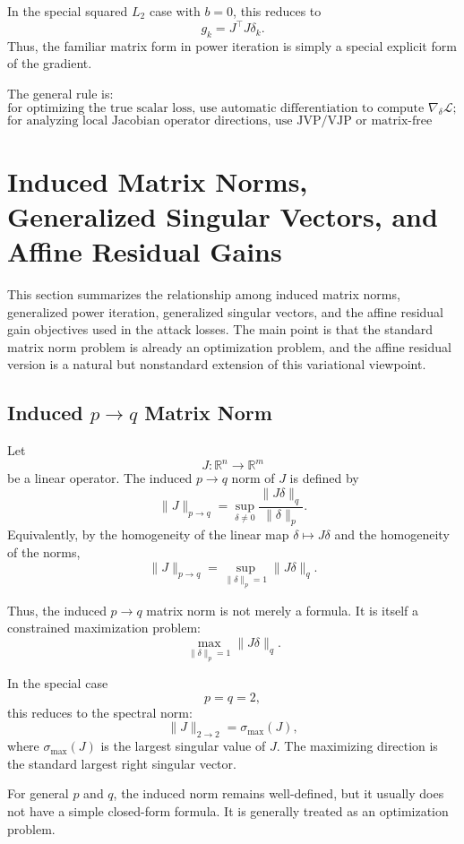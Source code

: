 \documentclass{article}
\begin{document}
In the special squared $L_2$ case with $b=0$, this reduces to
\[
\boxed{
g_k=J^\top J\delta_k.
}
\]
Thus, the familiar matrix form in power iteration is simply a special explicit form of the gradient.

The general rule is:
\[
\boxed{
\text{for optimizing the true scalar loss, use automatic differentiation to compute }
\nabla_\delta \mathcal L;
}
\]
\[
\boxed{
\text{for analyzing local Jacobian operator directions, use JVP/VJP or matrix-free spectral methods.}
}
\]

\section{Induced Matrix Norms, Generalized Singular Vectors, and Affine Residual Gains}

This section summarizes the relationship among induced matrix norms, generalized power iteration, generalized singular vectors, and the affine residual gain objectives used in the attack losses. The main point is that the standard matrix norm problem is already an optimization problem, and the affine residual version is a natural but nonstandard extension of this variational viewpoint.

\subsection{Induced $p\to q$ Matrix Norm}

Let
\[
J:\mathbb R^n\to\mathbb R^m
\]
be a linear operator. The induced $p\to q$ norm of $J$ is defined by
\[
\|J\|_{p\to q}
=
\sup_{\delta\neq 0}
\frac{\|J\delta\|_q}{\|\delta\|_p}.
\]
Equivalently, by the homogeneity of the linear map $\delta\mapsto J\delta$ and the homogeneity of the norms,
\[
\|J\|_{p\to q}
=
\sup_{\|\delta\|_p=1}
\|J\delta\|_q.
\]

Thus, the induced $p\to q$ matrix norm is not merely a formula. It is itself a constrained maximization problem:
\[
\max_{\|\delta\|_p=1}
\|J\delta\|_q.
\]

In the special case
\[
p=q=2,
\]
this reduces to the spectral norm:
\[
\|J\|_{2\to2}
=
\sigma_{\max}(J),
\]
where $\sigma_{\max}(J)$ is the largest singular value of $J$. The maximizing direction is the standard largest right singular vector.

For general $p$ and $q$, the induced norm remains well-defined, but it usually does not have a simple closed-form formula. It is generally treated as an optimization problem.
\end{document}
